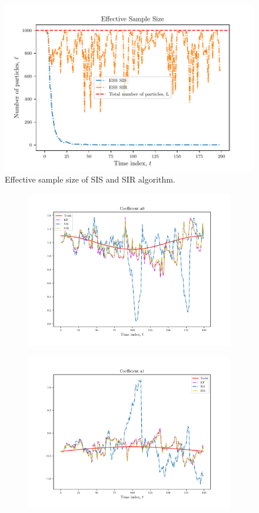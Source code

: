 \documentclass{article}
\begin{document}
\begin{figure}
    \centering
    \includegraphics[width=.5\textwidth]{Figures/ess.pdf}
    \caption{Effective sample size of SIS and SIR algorithm.}
    \label{fig:ess}
\end{figure}

\begin{figure}
    \begin{subfigure}{.5\textwidth}
        \includegraphics[width=\textwidth]{Figures/coefficient_a0.pdf}
    \end{subfigure}
    \begin{subfigure}{.5\textwidth}
        \includegraphics[width=\textwidth]{Figures/coefficient_a1.pdf}
    \end{subfigure}


\end{figure}
\end{document}
